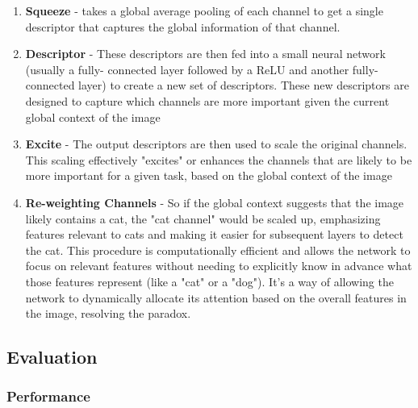 \documentclass[11pt]{article}
\begin{document}
\begin{enumerate}
    \item \textbf{Squeeze} -  takes a global average pooling of each channel to get a single
    descriptor that captures the global information of that channel.
    \item \textbf{Descriptor} - These descriptors are then fed into a small neural network (usually a fully-
    connected layer followed by a ReLU and another fully-connected layer) to create a new
    set of descriptors. These new descriptors are designed to capture which channels are
    more important given the current global context of the image
    \item \textbf{Excite} - The output descriptors are then used to scale the original channels. This scaling
    effectively "excites" or enhances the channels that are likely to be more important for a
    given task, based on the global context of the image
    \item \textbf{Re-weighting Channels} - So if the global context suggests that the image likely contains a cat, the "cat channel" would be scaled up, emphasizing features relevant to cats and making it easier for subsequent layers to detect the cat. This procedure is computationally efficient and allows the network to focus on relevant features without needing to explicitly know in advance what those features represent (like a "cat" or a "dog"). It's a way of allowing the network to dynamically allocate its attention based on the overall features in the image, resolving the paradox.
\end{enumerate}

\subsection{Evaluation}

\subsubsection{Performance}
\end{document}
